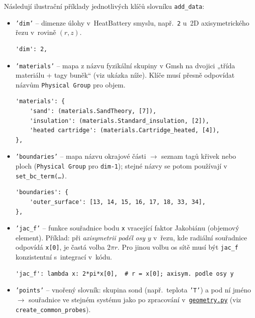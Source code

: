\documentclass[a4paper,11pt]{article}
\newcommand{\GitHubExOneGeometryURL}{https://github.com/LiborKudela/heat-battery/blob/master/examples/Example_01/geometry.py}
\newcommand{\GitHubExOneGeometry}{\href{\GitHubExOneGeometryURL}{\texttt{geometry.py}}}
\begin{document}
Následují ilustrační příklady jednotlivých klíčů slovníku \texttt{add\_data}:

\begin{itemize}
  \item \texttt{'dim'} -- dimenze úlohy v~HeatBattery smyslu, např.\ \texttt{2}
        u~2D axisymetrického řezu v~rovině $(r,z)$.

\begin{lstlisting}[style=py]
'dim': 2,
\end{lstlisting}

  \item \texttt{'materials'} -- mapa z názvu fyzikální skupiny v Gmsh na dvojici
        „třída materiálu + tagy buněk“ (viz ukázka níže). Klíče musí přesně
        odpovídat názvům \texttt{Physical Group} pro objem.

\begin{lstlisting}[style=py]
'materials': {
    'sand': (materials.SandTheory, [7]),
    'insulation': (materials.Standard_insulation, [2]),
    'heated cartridge': (materials.Cartridge_heated, [4]),
},
\end{lstlisting}

  \item \texttt{'boundaries'} -- mapa názvu okrajové části $\rightarrow$ seznam
        tagů křivek nebo ploch (\texttt{Physical Group} pro \texttt{dim-1});
        stejné názvy se potom používají v \texttt{set\_bc\_term(\ldots)}.

\begin{lstlisting}[style=py]
'boundaries': {
    'outer_surface': [13, 14, 15, 16, 17, 18, 33, 34],
},
\end{lstlisting}

  \item \texttt{'jac\_f'} -- funkce souřadnice bodu \texttt{x} vracející faktor
        Jakobiánu (objemový element). Příklad: při \emph{axisymetrii podél osy $y$}
        v~řezu, kde radiální souřadnice odpovídá \texttt{x[0]}, je častá volba
        $2\pi r$. Pro jinou volbu os sítě musí být \texttt{jac\_f} konzistentní
        s~integrací v~kódu.

\begin{lstlisting}[style=py]
'jac_f': lambda x: 2*pi*x[0],  # r = x[0]; axisym. podle osy y
\end{lstlisting}

  \item \texttt{'points'} -- vnořený slovník: skupina sond (např.\ teplota
        \texttt{'T'}) a pod ní jméno $\rightarrow$ souřadnice ve stejném systému jako
        po zpracování v~\GitHubExOneGeometry{} (viz \texttt{create\_common\_probes}).


\end{itemize}
\end{document}
